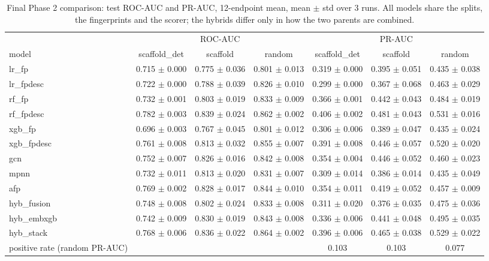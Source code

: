 
\begin{table}[t]
\centering
\caption{Final Phase 2 comparison: test ROC-AUC and PR-AUC, 12-endpoint mean, mean $\pm$ std over 3 runs. All models share the splits, the fingerprints and the scorer; the hybrids differ only in how the two parents are combined.}
\label{tab:hybrid-main}
\small
\begin{tabular}{lcccccc}
\toprule
 & \multicolumn{3}{c}{ROC-AUC} & \multicolumn{3}{c}{PR-AUC} \\
model & scaffold\_det & scaffold & random & scaffold\_det & scaffold & random \\
\midrule
lr\_fp & 0.715 $\pm$ 0.000 & 0.775 $\pm$ 0.036 & 0.801 $\pm$ 0.013 & 0.319 $\pm$ 0.000 & 0.395 $\pm$ 0.051 & 0.435 $\pm$ 0.038 \\
lr\_fpdesc & 0.722 $\pm$ 0.000 & 0.788 $\pm$ 0.039 & 0.826 $\pm$ 0.010 & 0.299 $\pm$ 0.000 & 0.367 $\pm$ 0.068 & 0.463 $\pm$ 0.029 \\
rf\_fp & 0.732 $\pm$ 0.001 & 0.803 $\pm$ 0.019 & 0.833 $\pm$ 0.009 & 0.366 $\pm$ 0.001 & 0.442 $\pm$ 0.043 & 0.484 $\pm$ 0.019 \\
rf\_fpdesc & 0.782 $\pm$ 0.003 & 0.839 $\pm$ 0.024 & 0.862 $\pm$ 0.002 & 0.406 $\pm$ 0.002 & 0.481 $\pm$ 0.043 & 0.531 $\pm$ 0.016 \\
xgb\_fp & 0.696 $\pm$ 0.003 & 0.767 $\pm$ 0.045 & 0.801 $\pm$ 0.012 & 0.306 $\pm$ 0.006 & 0.389 $\pm$ 0.047 & 0.435 $\pm$ 0.024 \\
xgb\_fpdesc & 0.761 $\pm$ 0.008 & 0.813 $\pm$ 0.032 & 0.855 $\pm$ 0.007 & 0.391 $\pm$ 0.008 & 0.446 $\pm$ 0.057 & 0.520 $\pm$ 0.020 \\
gcn & 0.752 $\pm$ 0.007 & 0.826 $\pm$ 0.016 & 0.842 $\pm$ 0.008 & 0.354 $\pm$ 0.004 & 0.446 $\pm$ 0.052 & 0.460 $\pm$ 0.023 \\
mpnn & 0.732 $\pm$ 0.011 & 0.813 $\pm$ 0.020 & 0.831 $\pm$ 0.007 & 0.309 $\pm$ 0.014 & 0.386 $\pm$ 0.014 & 0.435 $\pm$ 0.049 \\
afp & 0.769 $\pm$ 0.002 & 0.828 $\pm$ 0.017 & 0.844 $\pm$ 0.010 & 0.354 $\pm$ 0.011 & 0.419 $\pm$ 0.052 & 0.457 $\pm$ 0.009 \\
hyb\_fusion & 0.748 $\pm$ 0.008 & 0.802 $\pm$ 0.024 & 0.833 $\pm$ 0.008 & 0.311 $\pm$ 0.020 & 0.376 $\pm$ 0.035 & 0.475 $\pm$ 0.036 \\
hyb\_embxgb & 0.742 $\pm$ 0.009 & 0.830 $\pm$ 0.019 & 0.843 $\pm$ 0.008 & 0.336 $\pm$ 0.006 & 0.441 $\pm$ 0.048 & 0.495 $\pm$ 0.035 \\
hyb\_stack & 0.768 $\pm$ 0.006 & 0.836 $\pm$ 0.022 & 0.864 $\pm$ 0.002 & 0.396 $\pm$ 0.006 & 0.465 $\pm$ 0.038 & 0.529 $\pm$ 0.022 \\
\midrule
positive rate (random PR-AUC) & \multicolumn{3}{c}{} & 0.103 & 0.103 & 0.077 \\
\bottomrule
\end{tabular}
\end{table}

